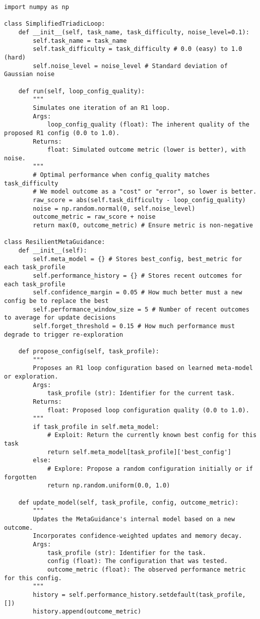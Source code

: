 \documentclass{article}
\begin{document}
\begin{verbatim}
import numpy as np

class SimplifiedTriadicLoop:
    def __init__(self, task_name, task_difficulty, noise_level=0.1):
        self.task_name = task_name
        self.task_difficulty = task_difficulty # 0.0 (easy) to 1.0 (hard)
        self.noise_level = noise_level # Standard deviation of Gaussian noise

    def run(self, loop_config_quality):
        """
        Simulates one iteration of an R1 loop.
        Args:
            loop_config_quality (float): The inherent quality of the proposed R1 config (0.0 to 1.0).
        Returns:
            float: Simulated outcome metric (lower is better), with noise.
        """
        # Optimal performance when config_quality matches task_difficulty
        # We model outcome as a "cost" or "error", so lower is better.
        raw_score = abs(self.task_difficulty - loop_config_quality)
        noise = np.random.normal(0, self.noise_level)
        outcome_metric = raw_score + noise
        return max(0, outcome_metric) # Ensure metric is non-negative

class ResilientMetaGuidance:
    def __init__(self):
        self.meta_model = {} # Stores best_config, best_metric for each task_profile
        self.performance_history = {} # Stores recent outcomes for each task_profile
        self.confidence_margin = 0.05 # How much better must a new config be to replace the best
        self.performance_window_size = 5 # Number of recent outcomes to average for update decisions
        self.forget_threshold = 0.15 # How much performance must degrade to trigger re-exploration

    def propose_config(self, task_profile):
        """
        Proposes an R1 loop configuration based on learned meta-model or exploration.
        Args:
            task_profile (str): Identifier for the current task.
        Returns:
            float: Proposed loop configuration quality (0.0 to 1.0).
        """
        if task_profile in self.meta_model:
            # Exploit: Return the currently known best config for this task
            return self.meta_model[task_profile]['best_config']
        else:
            # Explore: Propose a random configuration initially or if forgotten
            return np.random.uniform(0.0, 1.0) 

    def update_model(self, task_profile, config, outcome_metric):
        """
        Updates the MetaGuidance's internal model based on a new outcome.
        Incorporates confidence-weighted updates and memory decay.
        Args:
            task_profile (str): Identifier for the task.
            config (float): The configuration that was tested.
            outcome_metric (float): The observed performance metric for this config.
        """
        history = self.performance_history.setdefault(task_profile, [])
        history.append(outcome_metric)
        

\end{verbatim}
\end{document}
